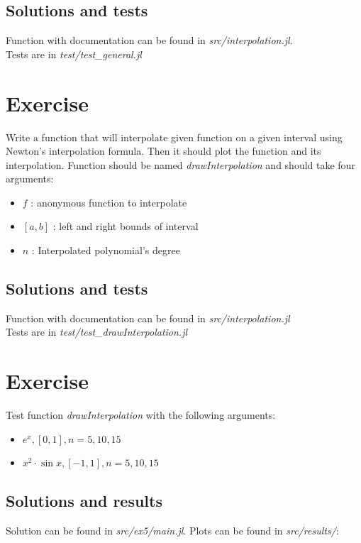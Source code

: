 \documentclass[11pt]{article}
\begin{document}
\subsection*{Solutions and tests}
Function with documentation can be found in \textit{src/interpolation.jl}.\\
Tests are in \textit{test/test\_general.jl}
\section{Exercise}
Write a function that will interpolate given function on a given interval using Newton's interpolation formula.
Then it should plot the function and its interpolation. Function should be named \textit{drawInterpolation} and should take four arguments:
\begin{itemize}
    \item $f$ : anonymous function to interpolate 
    \item $[a, b]$ : left and right bounds of interval
    \item $n$ : Interpolated polynomial's degree
\end{itemize}
\subsection*{Solutions and tests}
Function with documentation can be found in \textit{src/interpolation.jl}\\
Tests are in \textit{test/test\_drawInterpolation.jl}
\section{Exercise}
Test function \textit{drawInterpolation} with the following arguments:
\begin{itemize}
    \item $e^x, [0, 1], n=5,10,15$
    \item $x^2 \cdot \sin x, [-1, 1], n=5,10,15$
\end{itemize}
\subsection*{Solutions and results}
Solution can be found in \textit{src/ex5/main.jl}. Plots can be found in \textit{src/results/}:
\end{document}
